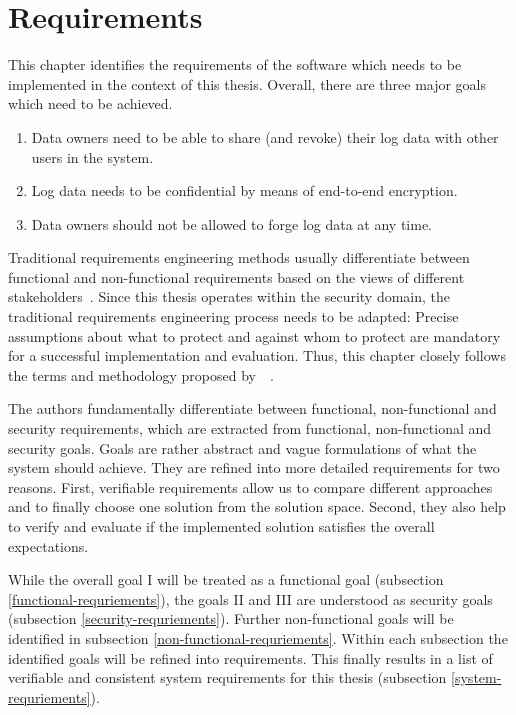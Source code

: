 \documentclass[../main.tex]{subfiles}
\begin{document}
\chapter{Requirements}
\label{requirements}

This chapter identifies the requirements of the software which needs to be implemented in the context of this thesis.
Overall, there are three major goals which need to be achieved. 

\begin{enumerate}[label=\Roman*.]
    \item Data owners need to be able to share (and revoke) their log data with other users in the system.
	\item Log data needs to be confidential by means of end-to-end encryption.
    \item Data owners should not be allowed to forge log data at any time.
\end{enumerate}


Traditional requirements engineering methods usually differentiate between functional and non-functional requirements based on the views of different stakeholders~.
Since this thesis operates within the security domain, the traditional requirements engineering process needs to be adapted: 
Precise assumptions about what to protect and against whom to protect are mandatory for a successful implementation and evaluation.
Thus, this chapter closely follows the terms and methodology proposed by~\citeauthor{Fabian2010}~\cite{Fabian2010}.

The authors fundamentally differentiate between functional, non-functional and security requirements, which are extracted from functional, non-functional and security goals.
Goals are rather abstract and vague formulations of what the system should achieve. 
They are refined into more detailed requirements for two reasons.
First, verifiable requirements allow us to compare different approaches and to finally choose one solution from the solution space. 
Second, they also help to verify and evaluate if the implemented solution satisfies the overall expectations.~\cite{Fabian2010}

While the overall goal I will be treated as a functional goal (subsection \ref{functional-requriements}), the goals II and III are understood as security goals (subsection \ref{security-requriements}).
Further non-functional goals will be identified in subsection \ref{non-functional-requriements}.
Within each subsection the identified goals will be refined into requirements.
This finally results in a list of verifiable and consistent system requirements for this thesis (subsection \ref{system-requriements}).
\end{document}

